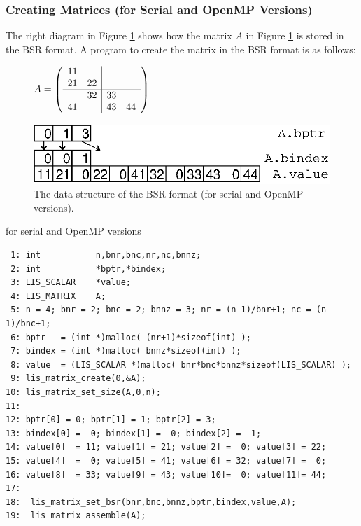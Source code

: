 \documentclass[a4paper]{article}
\begin{document}
\subsubsection{Creating Matrices (for Serial and OpenMP Versions)}
The right diagram in Figure \ref{fig:storage07} shows how the matrix $A$ in Figure \ref{fig:storage07} is stored in the BSR format. A program to create the matrix in the BSR format is as follows:
\begin{figure}[h]
{\centering 
\begin{minipage}{0.3\textwidth}
\begin{flushright}
$ 
A = \left(
\begin{array}{cc|cc}
11 &    &    &    \\
21 & 22 &    &    \\ \hline
   & 32 & 33 &    \\
41 &    & 43 & 44 \\
\end{array}\right)
$
\end{flushright}
\end{minipage}
\begin{minipage}{0.6\textwidth}
\begin{flushleft}
\includegraphics{storage07.eps} 
\end{flushleft}
\end{minipage}
\caption{The data structure of the BSR format (for serial and OpenMP versions).}\label{fig:storage07}}
\end{figure}
\begin{itembox}[l]{for serial and OpenMP versions}
\small
\begin{verbatim}
 1: int           n,bnr,bnc,nr,nc,bnnz;
 2: int           *bptr,*bindex;
 3: LIS_SCALAR    *value;
 4: LIS_MATRIX    A;
 5: n = 4; bnr = 2; bnc = 2; bnnz = 3; nr = (n-1)/bnr+1; nc = (n-1)/bnc+1;
 6: bptr   = (int *)malloc( (nr+1)*sizeof(int) );
 7: bindex = (int *)malloc( bnnz*sizeof(int) );
 8: value  = (LIS_SCALAR *)malloc( bnr*bnc*bnnz*sizeof(LIS_SCALAR) );
 9: lis_matrix_create(0,&A);
10: lis_matrix_set_size(A,0,n);
11:
12: bptr[0] = 0; bptr[1] = 1; bptr[2] = 3;
13: bindex[0] =  0; bindex[1] =  0; bindex[2] =  1;
14: value[0]  = 11; value[1] = 21; value[2] =  0; value[3] = 22;
15: value[4]  =  0; value[5] = 41; value[6] = 32; value[7] =  0;
16: value[8]  = 33; value[9] = 43; value[10]=  0; value[11]= 44;
17:
18:  lis_matrix_set_bsr(bnr,bnc,bnnz,bptr,bindex,value,A);
19:  lis_matrix_assemble(A);
\end{verbatim}
\end{itembox}
\newpage
\end{document}
